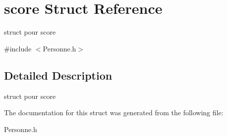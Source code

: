 \hypertarget{structscore}{}\section{score Struct Reference}
\label{structscore}


struct pour score  




{\ttfamily \#include $<$Personne.\+h$>$}



\subsection{Detailed Description}
struct pour score 

The documentation for this struct was generated from the following file\+:\begin{DoxyCompactItemize}
\item 
Personne.\+h\end{DoxyCompactItemize}
